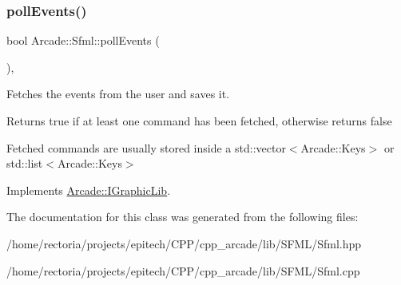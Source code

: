 \mbox{\label{class_arcade_1_1_sfml_a7b5fe6ccf84db8b3f2897805c965e607}} 
\subsubsection{\texorpdfstring{poll\+Events()}{pollEvents()}}
{\footnotesize\ttfamily bool Arcade\+::\+Sfml\+::poll\+Events (\begin{DoxyParamCaption}{ }\end{DoxyParamCaption})\hspace{0.3cm}{\ttfamily [final]}, {\ttfamily [virtual]}}



Fetches the events from the user and saves it. 

\begin{DoxyReturn}{Returns}
true if at least one command has been fetched, otherwise returns false
\end{DoxyReturn}
Fetched commands are usually stored inside a std\+::vector$<$\+Arcade\+::\+Keys$>$ or std\+::list$<$\+Arcade\+::\+Keys$>$ 

Implements \hyperlink{class_arcade_1_1_i_graphic_lib_a6be852f0395f08943f988c6823b80937}{Arcade\+::\+I\+Graphic\+Lib}.



The documentation for this class was generated from the following files\+:\begin{DoxyCompactItemize}
\item 
/home/rectoria/projects/epitech/\+C\+P\+P/cpp\+\_\+arcade/lib/\+S\+F\+M\+L/Sfml.\+hpp\item 
/home/rectoria/projects/epitech/\+C\+P\+P/cpp\+\_\+arcade/lib/\+S\+F\+M\+L/Sfml.\+cpp\end{DoxyCompactItemize}
